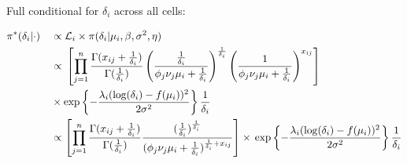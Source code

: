 \begin{Comment}
Full conditional for $\delta_i$ across all cells:
\begin{fleqn}
\begin{align*}
&\pi^*(\delta_i|\cdot)&&\propto{} \mathcal{L}_i\times\pi(\delta_i|\mu_i,\beta,\sigma^2,\eta)\\
& &&\propto{}\left[\prod_{j=1}^n\frac{\Gamma(x_{ij}+\frac{1}{\delta_i})}{\Gamma(\frac{1}{\delta_i})}\left(\frac{\frac{1}{\delta_i}}{\phi_j\nu_j\mu_i+\frac{1}{\delta_i}}\right)^\frac{1}{\delta_i}\left(\frac{1}{\phi_j\nu_j\mu_i+\frac{1}{\delta_i}}\right)^{x_{ij}}\right]\\
& &&\times\exp\left\lbrace-\frac{\lambda_i(\log(\delta_i)-f(\mu_i))^2}{2\sigma^2}\right\rbrace\frac{1}{\delta_i}\\
& &&\propto\left[\prod_{j=1}^n\frac{\Gamma(x_{ij}+\frac{1}{\delta_i})}{\Gamma(\frac{1}{\delta_i})}\frac{(\frac{1}{\delta_i})^{\frac{1}{\delta_i}}}{(\phi_j\nu_j\mu_i+\frac{1}{\delta_i})^{\frac{1}{\delta_i}+x_{ij}}}\right]\times{}\exp\left\lbrace-\frac{\lambda_i(\log(\delta_i)-f(\mu_i))^2}{2\sigma^2}\right\rbrace\frac{1}{\delta_i}\\
\end{align*}
\end{fleqn}

\end{Comment}

\newpage


